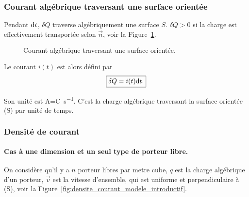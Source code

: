         \subsubsection{Courant algébrique traversant une surface orientée}

            Pendant $\mathrm{d} t$, $\delta Q$ traverse algébriquement une surface $S$. $\delta Q>0$ si la charge est effectivement transportée selon $\vec{n}$, voir la Figure~\ref{fig:courant_algebrique_traversant_surface_orientee}.

            \begin{figure}
                \centering
                \caption{Courant algébrique traversant une surface orientée.}    
                \label{fig:courant_algebrique_traversant_surface_orientee}
            \end{figure}

            Le courant $i(t)$ est alors défini par 
            \begin{equation*}
                \boxed{
                    \delta Q=i(t)\mathrm{d} t.
                }
            \end{equation*}

            Son unité est \si{\ampere}=\si{\coulomb\per\second}. C'est la charge algébrique traversant la surface orientée (S) par unité de temps.

        \subsubsection{Densité de courant}

            \paragraph{Cas à une dimension et un seul type de porteur libre.}

                On considère qu'il y a $n$ porteur libres par metre cube, $q$ est la charge algébrique d'un porteur, $\vec{v}$ est la vitesse d'ensemble, qui est uniforme et perpendiculaire à (S), voir la Figure~\ref{fig:densite_courant_modele_introductif}.

